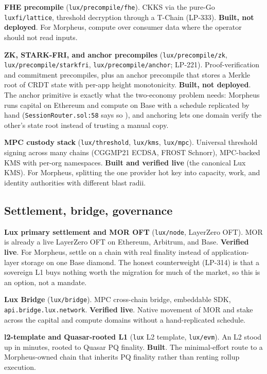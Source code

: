 \documentclass[11pt,a4paper]{article}
\newcommand{\code}[1]{\texttt{\small #1}}
\newcommand{\prov}[1]{{\color{muted}\footnotesize\sffamily[#1]}}
\begin{document}
\textbf{FHE precompile} (\code{lux/precompile/fhe}). CKKS via the pure-Go \code{luxfi/lattice},
threshold decryption through a T-Chain (LP-333). \textbf{Built, not deployed}. For Morpheus,
compute over consumer data where the operator should not read inputs.

\textbf{ZK, STARK-FRI, and anchor precompiles} (\code{lux/precompile/zk},
\code{lux/precompile/starkfri}, \code{lux/precompile/anchor}; LP-221). Proof-verification and
commitment precompiles, plus an anchor precompile that stores a Merkle root of CRDT state with
per-app height monotonicity. \textbf{Built, not deployed}. The anchor primitive is exactly what
the two-economy problem needs: Morpheus runs capital on Ethereum and compute on Base with a
schedule replicated by hand (\code{SessionRouter.sol:58} says so \prov{verified}), and anchoring
lets one domain verify the other's state root instead of trusting a manual copy.

\textbf{MPC custody stack} (\code{lux/threshold}, \code{lux/kms}, \code{lux/mpc}). Universal
threshold signing across many chains (CGGMP21 ECDSA, FROST Schnorr), MPC-backed KMS with per-org
namespaces. \textbf{Built and verified live} (the canonical Lux KMS). For Morpheus, splitting the
one provider hot key into capacity, work, and identity authorities with different blast radii.

\subsection{Settlement, bridge, governance}

\textbf{Lux primary settlement and MOR OFT} (\code{lux/node}, LayerZero OFT). MOR is already a
live LayerZero OFT on Ethereum, Arbitrum, and Base. \textbf{Verified live}. For Morpheus,
settle on a chain with real finality instead of application-layer storage on one Base diamond.
The honest counterweight (LP-314) is that a sovereign L1 buys nothing worth the migration for
much of the market, so this is an option, not a mandate.

\textbf{Lux Bridge} (\code{lux/bridge}). MPC cross-chain bridge, embeddable SDK,
\code{api.bridge.lux.network}. \textbf{Verified live}. Native movement of MOR and stake across
the capital and compute domains without a hand-replicated schedule.

\textbf{l2-template and Quasar-rooted L1} (\code{lux} L2 template, \code{lux/evm}). An L2 stood
up in minutes, rooted to Quasar PQ finality. \textbf{Built}. The minimal-effort route to a
Morpheus-owned chain that inherits PQ finality rather than renting rollup execution.
\end{document}
